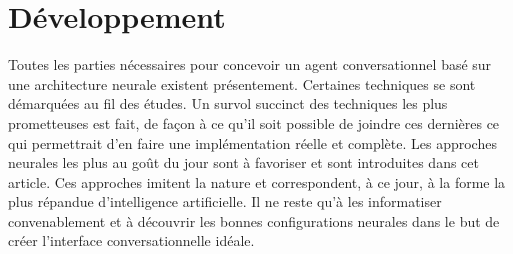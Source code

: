 \section{Développement}
Toutes les parties nécessaires pour concevoir un agent conversationnel basé sur une architecture neurale existent présentement. Certaines techniques se sont démarquées au fil des études. Un survol succinct des techniques les plus prometteuses est fait, de façon à ce qu'il soit possible de joindre ces dernières ce qui permettrait d'en faire une implémentation réelle et complète. Les approches neurales les plus au goût du jour sont à favoriser et sont introduites dans cet article. Ces approches imitent la nature et correspondent, à ce jour, à la forme la plus répandue d'intelligence artificielle. Il ne reste qu'à les informatiser convenablement et à découvrir les bonnes configurations neurales dans le but de créer l'interface conversationnelle idéale. \\







